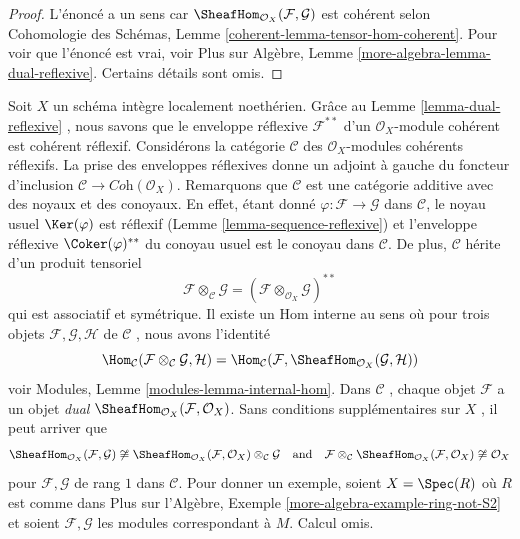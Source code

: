\begin{proof}
L'énoncé a un sens car  $\SheafHom_{\mathcal{O}_X}(\mathcal{F}, \mathcal{G})$  est cohérent selon Cohomologie des Schémas,
Lemme  \ref{coherent-lemma-tensor-hom-coherent}. Pour voir que l'énoncé est vrai, voir Plus sur Algèbre, Lemme
 \ref{more-algebra-lemma-dual-reflexive}. Certains détails sont omis.
\end{proof}

\begin{remark}
\label{remark-tensor}
Soit  $X$  un schéma intègre localement noethérien. Grâce au Lemme
 \ref{lemma-dual-reflexive} , nous savons que le enveloppe réflexive  $\mathcal{F}^{**}$  d’un
 $\mathcal{O}_X$-module cohérent est cohérent réflexif. Considérons la catégorie
 $\mathcal{C}$  des  $\mathcal{O}_X$-modules cohérents réflexifs. La prise des enveloppes
réflexives donne un adjoint à gauche du foncteur d’inclusion  $\mathcal{C} \to \textit{Coh}(\mathcal{O}_X)$.
Remarquons que  $\mathcal{C}$  est une catégorie additive avec des noyaux et des
conoyaux. En effet, étant donné  $\varphi : \mathcal{F} \to \mathcal{G}$  dans  $\mathcal{C}$, le noyau usuel
 $\Ker(\varphi)$  est réflexif (Lemme  \ref{lemma-sequence-reflexive}) et l’enveloppe réflexive
 $\Coker(\varphi)^{**}$  du conoyau usuel est le conoyau dans  $\mathcal{C}$. De plus,
 $\mathcal{C}$  hérite d’un produit tensoriel
$$
\mathcal{F} \otimes_\mathcal{C} \mathcal{G} =
(\mathcal{F} \otimes_{\mathcal{O}_X} \mathcal{G})^{**}
$$
qui est associatif et symétrique. Il existe un Hom interne au sens où pour trois
objets  $\mathcal{F}, \mathcal{G}, \mathcal{H}$  de  $\mathcal{C}$ , nous avons l’identité
$$
\Hom_\mathcal{C}(\mathcal{F} \otimes_\mathcal{C} \mathcal{G}, \mathcal{H}) =
\Hom_\mathcal{C}(\mathcal{F},
\SheafHom_{\mathcal{O}_X}(\mathcal{G}, \mathcal{H}))
$$
voir Modules, Lemme  \ref{modules-lemma-internal-hom}. Dans  $\mathcal{C}$ , chaque objet  $\mathcal{F}$  a
un objet  {\it  dual }   $\SheafHom_{\mathcal{O}_X}(\mathcal{F}, \mathcal{O}_X)$. Sans conditions
supplémentaires sur  $X$ , il peut arriver que
$$
\SheafHom_{\mathcal{O}_X}(\mathcal{F}, \mathcal{G}) \not \cong
\SheafHom_{\mathcal{O}_X}(\mathcal{F}, \mathcal{O}_X)
\otimes_\mathcal{C} \mathcal{G}
\quad\text{and}\quad
\mathcal{F} \otimes_\mathcal{C}
\SheafHom_{\mathcal{O}_X}(\mathcal{F}, \mathcal{O}_X)
\not \cong \mathcal{O}_X
$$
pour  $\mathcal{F}, \mathcal{G}$  de rang  $1$  dans  $\mathcal{C}$. Pour donner un exemple,
soient  $X = \Spec(R)$  où  $R$  est comme dans Plus sur l'Algèbre, Exemple
 \ref{more-algebra-example-ring-not-S2}  et soient  $\mathcal{F}, \mathcal{G}$  les modules correspondant à  $M$.
Calcul omis.
\end{remark}

